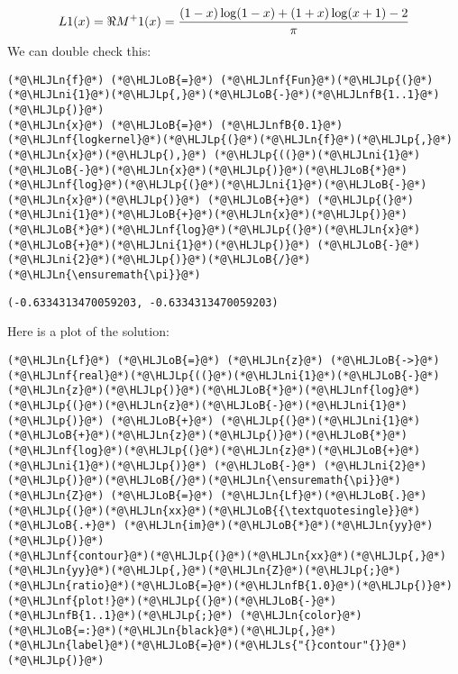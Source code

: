 \documentclass[12pt,a4paper]{article}
\newcommand{\HLJLn}[1]{#1}
\newcommand{\HLJLnf}[1]{\textcolor[RGB]{66,102,213}{#1}}
\newcommand{\HLJLs}[1]{\textcolor[RGB]{201,61,57}{#1}}
\newcommand{\HLJLnfB}[1]{\textcolor[RGB]{59,151,46}{#1}}
\newcommand{\HLJLni}[1]{\textcolor[RGB]{59,151,46}{#1}}
\newcommand{\HLJLoB}[1]{\textcolor[RGB]{102,102,102}{\textbf{#1}}}
\newcommand{\HLJLp}[1]{#1}
\begin{document}
\[
L 1(x) = \Re M^+ 1(x) = {(1-x) \log(1-x) + (1+x)\log(x+1) - 2\over \pi}
\]
We can double check this:


\begin{lstlisting}
(*@\HLJLn{f}@*) (*@\HLJLoB{=}@*) (*@\HLJLnf{Fun}@*)(*@\HLJLp{(}@*)(*@\HLJLni{1}@*)(*@\HLJLp{,}@*)(*@\HLJLoB{-}@*)(*@\HLJLnfB{1..1}@*)(*@\HLJLp{)}@*)
(*@\HLJLn{x}@*) (*@\HLJLoB{=}@*) (*@\HLJLnfB{0.1}@*)
(*@\HLJLnf{logkernel}@*)(*@\HLJLp{(}@*)(*@\HLJLn{f}@*)(*@\HLJLp{,}@*)(*@\HLJLn{x}@*)(*@\HLJLp{),}@*) (*@\HLJLp{((}@*)(*@\HLJLni{1}@*)(*@\HLJLoB{-}@*)(*@\HLJLn{x}@*)(*@\HLJLp{)}@*)(*@\HLJLoB{*}@*)(*@\HLJLnf{log}@*)(*@\HLJLp{(}@*)(*@\HLJLni{1}@*)(*@\HLJLoB{-}@*)(*@\HLJLn{x}@*)(*@\HLJLp{)}@*) (*@\HLJLoB{+}@*) (*@\HLJLp{(}@*)(*@\HLJLni{1}@*)(*@\HLJLoB{+}@*)(*@\HLJLn{x}@*)(*@\HLJLp{)}@*)(*@\HLJLoB{*}@*)(*@\HLJLnf{log}@*)(*@\HLJLp{(}@*)(*@\HLJLn{x}@*)(*@\HLJLoB{+}@*)(*@\HLJLni{1}@*)(*@\HLJLp{)}@*) (*@\HLJLoB{-}@*) (*@\HLJLni{2}@*)(*@\HLJLp{)}@*)(*@\HLJLoB{/}@*)(*@\HLJLn{\ensuremath{\pi}}@*)
\end{lstlisting}

\begin{lstlisting}
(-0.6334313470059203, -0.6334313470059203)
\end{lstlisting}


Here is a plot of the solution:


\begin{lstlisting}
(*@\HLJLn{Lf}@*) (*@\HLJLoB{=}@*) (*@\HLJLn{z}@*) (*@\HLJLoB{->}@*) (*@\HLJLnf{real}@*)(*@\HLJLp{((}@*)(*@\HLJLni{1}@*)(*@\HLJLoB{-}@*)(*@\HLJLn{z}@*)(*@\HLJLp{)}@*)(*@\HLJLoB{*}@*)(*@\HLJLnf{log}@*)(*@\HLJLp{(}@*)(*@\HLJLn{z}@*)(*@\HLJLoB{-}@*)(*@\HLJLni{1}@*)(*@\HLJLp{)}@*) (*@\HLJLoB{+}@*) (*@\HLJLp{(}@*)(*@\HLJLni{1}@*)(*@\HLJLoB{+}@*)(*@\HLJLn{z}@*)(*@\HLJLp{)}@*)(*@\HLJLoB{*}@*)(*@\HLJLnf{log}@*)(*@\HLJLp{(}@*)(*@\HLJLn{z}@*)(*@\HLJLoB{+}@*)(*@\HLJLni{1}@*)(*@\HLJLp{)}@*) (*@\HLJLoB{-}@*) (*@\HLJLni{2}@*)(*@\HLJLp{)}@*)(*@\HLJLoB{/}@*)(*@\HLJLn{\ensuremath{\pi}}@*)
(*@\HLJLn{Z}@*) (*@\HLJLoB{=}@*) (*@\HLJLn{Lf}@*)(*@\HLJLoB{.}@*)(*@\HLJLp{(}@*)(*@\HLJLn{xx}@*)(*@\HLJLoB{{\textquotesingle}}@*) (*@\HLJLoB{.+}@*) (*@\HLJLn{im}@*)(*@\HLJLoB{*}@*)(*@\HLJLn{yy}@*)(*@\HLJLp{)}@*)
(*@\HLJLnf{contour}@*)(*@\HLJLp{(}@*)(*@\HLJLn{xx}@*)(*@\HLJLp{,}@*)(*@\HLJLn{yy}@*)(*@\HLJLp{,}@*)(*@\HLJLn{Z}@*)(*@\HLJLp{;}@*)(*@\HLJLn{ratio}@*)(*@\HLJLoB{=}@*)(*@\HLJLnfB{1.0}@*)(*@\HLJLp{)}@*)
(*@\HLJLnf{plot!}@*)(*@\HLJLp{(}@*)(*@\HLJLoB{-}@*)(*@\HLJLnfB{1..1}@*)(*@\HLJLp{;}@*) (*@\HLJLn{color}@*)(*@\HLJLoB{=:}@*)(*@\HLJLn{black}@*)(*@\HLJLp{,}@*) (*@\HLJLn{label}@*)(*@\HLJLoB{=}@*)(*@\HLJLs{"{}contour"{}}@*)(*@\HLJLp{)}@*)
\end{lstlisting}
\end{document}
